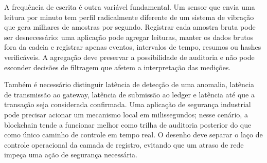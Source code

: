 \documentclass[10pt,a4paper,twocolumn]{article}
\begin{document}
A frequência de escrita é outra variável fundamental. Um sensor que envia uma leitura por minuto tem perfil radicalmente diferente de um sistema de vibração que gera milhares de amostras por segundo. Registrar cada amostra bruta pode ser desnecessário: uma aplicação pode agregar leituras, manter os dados brutos fora da cadeia e registrar apenas eventos, intervalos de tempo, resumos ou hashes verificáveis. A agregação deve preservar a possibilidade de auditoria e não pode esconder decisões de filtragem que afetem a interpretação das medições.

Também é necessário distinguir latência de detecção de uma anomalia, latência de transmissão ao gateway, latência de submissão ao ledger e latência até que a transação seja considerada confirmada. Uma aplicação de segurança industrial pode precisar acionar um mecanismo local em milissegundos; nesse cenário, a blockchain tende a funcionar melhor como trilha de auditoria posterior do que como único caminho de controle em tempo real. O desenho deve separar o laço de controle operacional da camada de registro, evitando que um atraso de rede impeça uma ação de segurança necessária.
\end{document}

